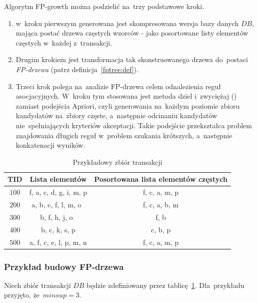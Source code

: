 Algorytm FP-growth można podzielić na~trzy podstawowe kroki.
\begin{enumerate}
	\item w~kroku pierwszym generowana jest skompresowana wersja bazy danych $DB$, mająca postać drzewa częstych wzorców - jako posortowane listy elementów częstych w~każdej z~transakcji.
	\item Drugim krokiem jest transformacja tak skonstruowanego drzewa do~postaci \emph{FP-drzewa} (patrz definicja~\ref{fptree:def}).
	\item Trzeci krok polega na~analizie FP-drzewa celem odnalezienia reguł asocjacyjnych. W~kroku tym stosowana jest metoda dziel i~zwyciężaj () zamiast podejścia Apriori, czyli generowania na~każdym poziomie zbioru kandydatów na~zbiory częste, a~następnie odcinaniu kandydatów nie~spełniających kryteriów akceptacji. Takie podejście przekształca problem znajdowania długich reguł w~problem szukania krótszych, a~następnie konkatenacji wyników. 
\end{enumerate}

\begin{table}
	\centering
	\begin{tabular}{c|c|c}
	\textbf{TID} &  \textbf{Lista elementów} & \textbf{Posortowana lista elementów częstych} \\ \hline
	$100$ & f, a, c, d, g, i, m, p & f, c, a, m, p \\ 
	$200$ & a, b, c, f, l, m, o~& f, c, a, b, m \\ 
	$300$ & b, f, h, j, o~& f, b \\
	$400$ & b, c, k, s, p & c, b, p \\
	$500$ & a, f, c, e, l, p, m, n & f, c, a, m, p \\ 
	\end{tabular}
	\caption{Przykładowy zbiór transakcji\label{example:fp_data}}
\end{table}

\subsubsection{Przykład budowy FP-drzewa}\label{sec:example_fptree}
Niech zbiór transakcji $DB$ będzie zdefiniowany przez tablicę~\ref{example:fp_data}. Dla~przykładu przyjęto, że~$minsup = 3$.

